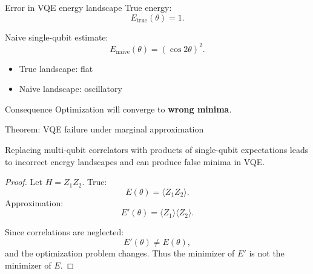 \documentclass[aspectratio=169]{beamer}
\begin{document}

\begin{frame}{Error in VQE energy landscape}
True energy:
\[
E_{\text{true}}(\theta) = 1.
\]

Naive single-qubit estimate:
\[
E_{\text{naive}}(\theta) = (\cos 2\theta)^2.
\]

\medskip

\begin{itemize}
\item True landscape: flat
\item Naive landscape: oscillatory
\end{itemize}

\medskip

\begin{block}{Consequence}
Optimization will converge to \textbf{wrong minima}.
\end{block}
\end{frame}


\begin{frame}{Theorem: VQE failure under marginal approximation}
\begin{theorem}
Replacing multi-qubit correlators with products of single-qubit expectations leads to incorrect energy landscapes and can produce false minima in VQE.
\end{theorem}

\begin{proof}
Let $H = Z_1 Z_2$.
True:
\[
E(\theta) = \langle Z_1 Z_2 \rangle.
\]
Approximation:
\[
E'(\theta) = \langle Z_1 \rangle \langle Z_2 \rangle.
\]

Since correlations are neglected:
\[
E'(\theta) \neq E(\theta),
\]
and the optimization problem changes. Thus the minimizer of $E'$ is not the minimizer of $E$.
\end{proof}
\end{frame}



\end{document}
